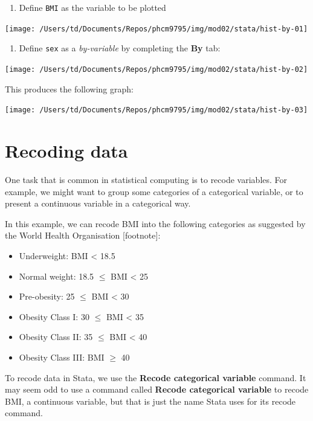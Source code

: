 \documentclass[
]{memoir}
\providecommand{\tightlist}{%
  \setlength{\itemsep}{0pt}\setlength{\parskip}{0pt}}
\begin{document}
\begin{enumerate}
\def\labelenumi{\arabic{enumi})}
\tightlist
\item
  Define \texttt{BMI} as the variable to be plotted
\end{enumerate}

\texttt{[image: /Users/td/Documents/Repos/phcm9795/img/mod02/stata/hist-by-01]}

\begin{enumerate}
\def\labelenumi{\arabic{enumi})}
\setcounter{enumi}{1}
\tightlist
\item
  Define \texttt{sex} as a \emph{by-variable} by completing the \textbf{By} tab:
\end{enumerate}

\texttt{[image: /Users/td/Documents/Repos/phcm9795/img/mod02/stata/hist-by-02]}

This produces the following graph:

\texttt{[image: /Users/td/Documents/Repos/phcm9795/img/mod02/stata/hist-by-03]}

\hypertarget{recoding-data}{%
\section{Recoding data}\label{recoding-data}}

One task that is common in statistical computing is to recode variables. For example, we might want to group some categories of a categorical variable, or to present a continuous variable in a categorical way.

In this example, we can recode BMI into the following categories as suggested by the World Health Organisation {[}footnote{]}:

\begin{itemize}
\tightlist
\item
  Underweight: BMI \textless{} 18.5
\item
  Normal weight: 18.5 \(\le\) BMI \textless{} 25
\item
  Pre-obesity: 25 \(\le\) BMI \textless{} 30
\item
  Obesity Class I: 30 \(\le\) BMI \textless{} 35
\item
  Obesity Class II: 35 \(\le\) BMI \textless{} 40
\item
  Obesity Class III: BMI \(\ge\) 40
\end{itemize}

To recode data in Stata, we use the \textbf{Recode categorical variable} command. It may seem odd to use a command called \textbf{Recode categorical variable} to recode BMI, a continuous variable, but that is just the name Stata uses for its recode command.
\end{document}
